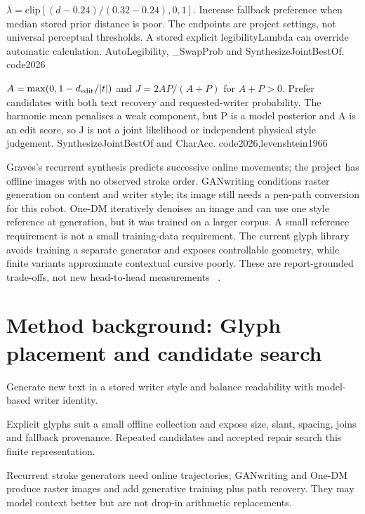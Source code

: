 {$\lambda=\mathrm{clip}[(d-0.24)/(0.32-0.24),0,1]$.}
{Increase fallback preference when median stored prior distance is poor.
The endpoints are project settings, not universal perceptual thresholds.
A stored explicit legibilityLambda can override automatic calculation.}
{AutoLegibility, \_SwapProb and SynthesizeJointBestOf.}
{code2026}

{$A=\max(0,1-d_{\rm edit}/|t|)$ and $J=2AP/(A+P)$ for $A+P>0$.}
{Prefer candidates with both text recovery and requested-writer probability.
The harmonic mean penalises a weak component, but P is a model posterior
and A is an edit score, so J is not a joint likelihood or independent physical
style judgement.}
{SynthesizeJointBestOf and CharAcc.}
{code2026,levenshtein1966}

Graves's recurrent synthesis predicts successive online movements; the project
has offline images with no observed stroke order. GANwriting conditions raster
generation on content and writer style; its image still needs a pen-path
conversion for this robot. One-DM iteratively denoises an image and can use one
style reference at generation, but it was trained on a larger corpus. A small
reference requirement is not a small training-data requirement. The current
glyph library avoids training a separate generator and exposes controllable
geometry, while finite variants approximate contextual cursive poorly. These
are report-grounded trade-offs, not new head-to-head measurements
~\cite{gravesgenerate,ganwriting,onedm,haines2016}.


\section{Method background: Glyph placement and candidate search}\label{method:synth}
Generate new text in a stored writer style and balance readability with model-based writer identity.


Explicit glyphs suit a small offline collection and expose size, slant, spacing, joins and fallback provenance. Repeated candidates and accepted repair search this finite representation.


Recurrent stroke generators need online trajectories; GANwriting and One-DM produce raster images and add generative training plus path recovery. They may model context better but are not drop-in arithmetic replacements.


